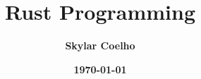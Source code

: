 \usepackage{imakeidx}
\makeindex[columns = 3, intoc]

\usepackage[]{graphicx, svg, float}

\title{\vspace{-4cm}\\ \sffamily\bfseries{}Rust Programming}
\author{\sffamily\bfseries{}Skylar Coelho}
\date{\sffamily\bfseries\today}

\usepackage{sectsty}
\allsectionsfont{\sffamily\bfseries}

\usepackage[]{minted}

\usepackage[]{pagecolor}
\pagecolor{darkgray}
\color{softwhite}

\usepackage[]{hyperref}
\usepackage[dvipsnames]{xcolor}
\hypersetup{colorlinks=true, linkcolor=RedOrange}

\newcommand{\code}[1]{\textbf{\texttt{\color{orange}#1}}}

\usepackage[]{booktabs}
